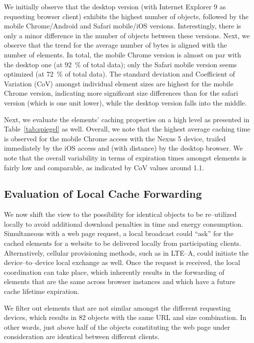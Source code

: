 We initially observe that the desktop version (with Internet Explorer 9 as requesting browser client) exhibits the highest number of objects, followed by the mobile Chrome/Android and Safari mobile/iOS versions.
Interestingly, there is only a minor difference in the number of objects between these versions.
Next, we observe that the trend for the average number of bytes is aligned with the number of elements. 
In total, the mobile Chrome version is almost on par with the desktop one (at 92~\% of total data); only the Safari mobile version seems optimized (at 72~\% of total data).
The standard deviation and Coefficient of Variation (CoV) amongst individual element sizes are highest for the mobile Chrome version, indicating more significant size differences than for the safari version (which is one unit lower), while the desktop version falls into the middle.

Next, we evaluate the elements' caching properties on a high level as presented in Table~\ref{tab:spiegel} as well. 
Overall, we note that the highest average caching time is observed for the mobile Chrome access with the Nexus 5 device, trailed immediately by the iOS access and (with distance) by the desktop browser.
We note that the overall variability in terms of expiration times amongst elements is fairly low and comparable, as indicated by CoV values around 1.1.

\subsection*{Evaluation of Local Cache Forwarding}
We now shift the view to the possibility for identical objects to be re--utilized locally to avoid additional download penalties in time and energy consumption.
Simultaneous with a web page request, a local broadcast could ``ask'' for the cached elements for a website to be delivered locally from participating clients. 
Alternatively, cellular provisioning methods, such as in LTE--A, could initiate the device--to--device local exchange as well.
Once the request is received, the local coordination can take place, which inherently results in the forwarding of elements that are the same across browser instances and which have a future cache lifetime expiration.

We filter out elements that are not similar amongst the different requesting devices, which results in 82 objects with the same URL and size combination. 
In other words, just above half of the objects constituting the web page under consideration are identical between different clients.

